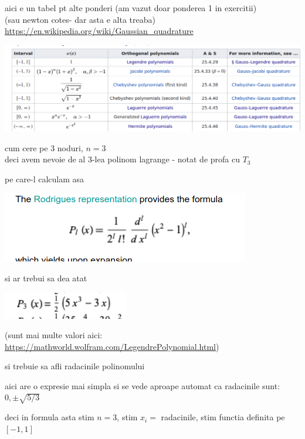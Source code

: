 \documentclass[11pt]{article}
\begin{document}
aici e un tabel pt alte ponderi (am vazut doar ponderea 1 in exercitii)\\
(sau newton cotes- dar asta e alta treaba)\\
\url{https://en.wikipedia.org/wiki/Gaussian\_quadrature}

\begin{center}
\includegraphics[width=\linewidth]{./table.png}
\end{center}

cum cere pe 3 noduri, \(n = 3\)\\
deci avem nevoie de al 3-lea polinom lagrange - notat de profa cu \(T_3\)
\medskip

pe care-l calculam asa

\begin{center}
\includegraphics[width=.6\linewidth]{./rodrigues.png}
\end{center}

si ar trebui sa dea atat

\begin{center}
\includegraphics[width=.4\linewidth]{./lagrange3.png}
\end{center}

(sunt mai multe valori aici:\\
\url{https://mathworld.wolfram.com/LegendrePolynomial.html})
\medskip

si trebuie sa afli radacinile polinomului

\medskip
aici are o expresie mai simpla si se vede aproape automat ca radacinile sunt:\\
\(0, \pm \sqrt{5/3}\)

\medskip
deci in formula asta stim \(n =3\), stim \(x_i =\) radacinile, stim functia definita pe \([-1, 1]\)
\end{document}
